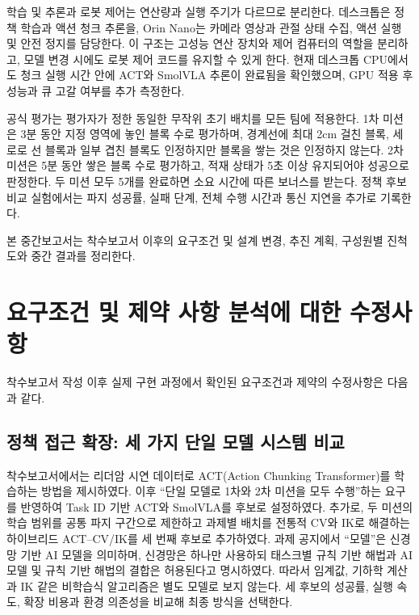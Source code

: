 \documentclass[titlepage]{pnureport}
\begin{document}
학습 및 추론과 로봇 제어는 연산량과 실행 주기가 다르므로 분리한다. 데스크톱은 정책 학습과 액션 청크 추론을, Orin Nano는 카메라 영상과 관절 상태 수집, 액션 실행 및 안전 정지를 담당한다. 이 구조는 고성능 연산 장치와 제어 컴퓨터의 역할을 분리하고, 모델 변경 시에도 로봇 제어 코드를 유지할 수 있게 한다. 현재 데스크톱 CPU에서도 청크 실행 시간 안에 ACT와 SmolVLA 추론이 완료됨을 확인했으며, GPU 적용 후 성능과 큐 고갈 여부를 추가 측정한다.

공식 평가는 평가자가 정한 동일한 무작위 초기 배치를 모든 팀에 적용한다. 1차 미션은 3분 동안 지정 영역에 놓인 블록 수로 평가하며, 경계선에 최대 2cm 걸친 블록, 세로로 선 블록과 일부 겹친 블록도 인정하지만 블록을 쌓는 것은 인정하지 않는다. 2차 미션은 5분 동안 쌓은 블록 수로 평가하고, 적재 상태가 5초 이상 유지되어야 성공으로 판정한다. 두 미션 모두 5개를 완료하면 소요 시간에 따른 보너스를 받는다. 정책 후보 비교 실험에서는 파지 성공률, 실패 단계, 전체 수행 시간과 통신 지연을 추가로 기록한다.

본 중간보고서는 착수보고서 이후의 요구조건 및 설계 변경, 추진 계획, 구성원별 진척도와 중간 결과를 정리한다.

\chapter{요구조건 및 제약 사항 분석에 대한 수정사항}

착수보고서 작성 이후 실제 구현 과정에서 확인된 요구조건과 제약의 수정사항은 다음과 같다.

\section{정책 접근 확장: 세 가지 단일 모델 시스템 비교}

착수보고서에서는 리더암 시연 데이터로 ACT(Action Chunking Transformer)를 학습하는 방법을 제시하였다. 이후 ``단일 모델로 1차와 2차 미션을 모두 수행''하는 요구를 반영하여 Task ID 기반 ACT와 SmolVLA\cite{smolvla}를 후보로 설정하였다. 추가로, 두 미션의 학습 범위를 공통 파지 구간으로 제한하고 과제별 배치를 전통적 CV와 IK로 해결하는 하이브리드 ACT--CV/IK를 세 번째 후보로 추가하였다. 과제 공지에서 ``모델''은 신경망 기반 AI 모델을 의미하며, 신경망은 하나만 사용하되 태스크별 규칙 기반 해법과 AI 모델 및 규칙 기반 해법의 결합은 허용된다고 명시하였다. 따라서 임계값, 기하학 계산과 IK 같은 비학습식 알고리즘은 별도 모델로 보지 않는다. 세 후보의 성공률, 실행 속도, 확장 비용과 환경 의존성을 비교해 최종 방식을 선택한다.
\end{document}
